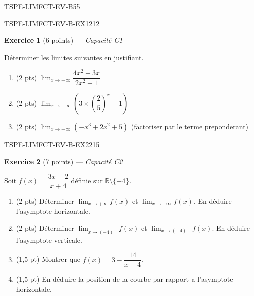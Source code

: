 \begin{evaluation}{TSPE-LIMFCT-EV-B}{55}


\begin{exercice}{TSPE-LIMFCT-EV-B-EX1}{2}{12}

\textbf{Exercice 1} (6 points) — \textit{Capacité C1}

\medskip

Déterminer les limites suivantes en justifiant.

\begin{enumerate}
  \item (2 pts) $\lim_{x \to +\infty} \dfrac{4x^2 - 3x}{2x^2 + 1}$
  \item (2 pts) $\lim_{x \to +\infty} \left(3 \times \left(\dfrac{2}{5}\right)^x - 1\right)$
  \item (2 pts) $\lim_{x \to +\infty} (-x^3 + 2x^2 + 5)$ (factoriser par le terme preponderant)
\end{enumerate}

\end{exercice}


\begin{exercice}{TSPE-LIMFCT-EV-B-EX2}{2}{15}

\textbf{Exercice 2} (7 points) — \textit{Capacité C2}

\medskip

Soit $f(x) = \dfrac{3x - 2}{x + 4}$ définie sur $\mathbb{R} \setminus \{-4\}$.

\begin{enumerate}
  \item (2 pts) Déterminer $\lim_{x \to +\infty} f(x)$ et $\lim_{x \to -\infty} f(x)$. En déduire l'asymptote horizontale.
  \item (2 pts) Déterminer $\lim_{x \to (-4)^+} f(x)$ et $\lim_{x \to (-4)^-} f(x)$. En déduire l'asymptote verticale.
  \item (1,5 pt) Montrer que $f(x) = 3 - \dfrac{14}{x+4}$.
  \item (1,5 pt) En déduire la position de la courbe par rapport a l'asymptote horizontale.
\end{enumerate}


\end{exercice}
\end{evaluation}
